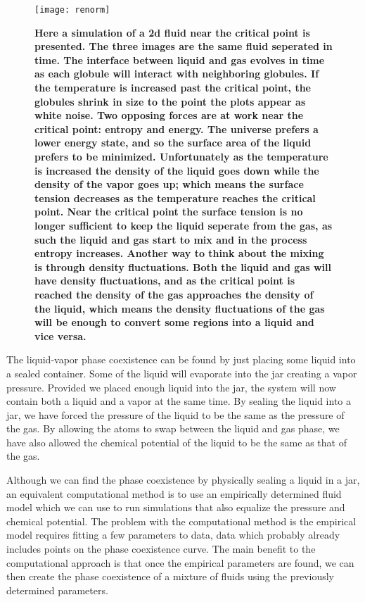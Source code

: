 \begin{figure}[h]
\vspace*{-5mm}
\hspace*{-6mm}
	\centering
	\texttt{[image: renorm]}
	\caption{
	\scriptsize
	\textbf{Here a simulation of a 2d fluid near the critical point is presented. The three images are the same fluid seperated in time. The interface between liquid and gas evolves in time as each globule will interact with neighboring globules. If the temperature is increased past the critical point, the globules shrink in size to the point the plots appear as white noise. Two opposing forces are at work near the critical point: entropy and energy. The universe prefers a lower energy state, and so the surface area of the liquid prefers to be minimized. Unfortunately as the temperature is increased the density of the liquid goes down while the density of the vapor goes up; which means the surface tension decreases as the temperature reaches the critical point. Near the critical point the surface tension is no longer sufficient to keep the liquid seperate from the gas, as such the liquid and gas start to mix and in the process entropy increases. 
Another way to think about the mixing is through density fluctuations. Both the liquid and gas will have density fluctuations, and as the critical point is reached the density of the gas approaches the density of the liquid, which means the density fluctuations of the gas will be enough to convert some regions into a liquid and vice versa.}}
	\label{fig:renorm}
\end{figure}

The liquid-vapor phase coexistence can be found by just placing some liquid into a sealed container. Some of the liquid will evaporate into the jar creating a vapor pressure. Provided we placed enough liquid into the jar, the system will now contain both a liquid and a vapor at the same time. By sealing the liquid into a jar, we have forced the pressure of the liquid to be the same as the pressure of the gas. By allowing the atoms to swap between the liquid and gas phase, we have also allowed the chemical potential of the liquid to be the same as that of the gas.

Although we can find the phase coexistence by physically sealing a liquid in a jar, an equivalent computational method is to use an empirically determined fluid model which we can use to run simulations that also equalize the pressure and chemical potential. The problem with the computational method is the empirical model requires fitting a few parameters to data, data which probably already includes points on the phase coexistence curve. The main benefit to the computational approach is that once the empirical parameters are found, we can then create the phase coexistence of a mixture of fluids using the previously determined parameters.

